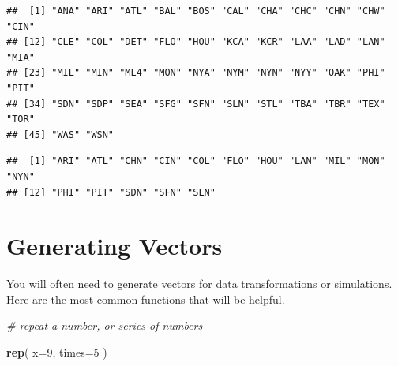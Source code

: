 \documentclass[]{book}
\newenvironment{Shaded}{\begin{snugshade}}{\end{snugshade}}
\newcommand{\CommentTok}[1]{\textcolor[rgb]{0.56,0.35,0.01}{\textit{#1}}}
\newcommand{\DataTypeTok}[1]{\textcolor[rgb]{0.13,0.29,0.53}{#1}}
\newcommand{\DecValTok}[1]{\textcolor[rgb]{0.00,0.00,0.81}{#1}}
\newcommand{\KeywordTok}[1]{\textcolor[rgb]{0.13,0.29,0.53}{\textbf{#1}}}
\newcommand{\NormalTok}[1]{#1}
\newcommand{\OperatorTok}[1]{\textcolor[rgb]{0.81,0.36,0.00}{\textbf{#1}}}
\newcommand{\StringTok}[1]{\textcolor[rgb]{0.31,0.60,0.02}{#1}}
\theoremstyle{definition}
\theoremstyle{definition}
\theoremstyle{definition}
\theoremstyle{remark}
\begin{document}
\begin{Shaded}
\end{Shaded}

\begin{verbatim}
##  [1] "ANA" "ARI" "ATL" "BAL" "BOS" "CAL" "CHA" "CHC" "CHN" "CHW" "CIN"
## [12] "CLE" "COL" "DET" "FLO" "HOU" "KCA" "KCR" "LAA" "LAD" "LAN" "MIA"
## [23] "MIL" "MIN" "ML4" "MON" "NYA" "NYM" "NYN" "NYY" "OAK" "PHI" "PIT"
## [34] "SDN" "SDP" "SEA" "SFG" "SFN" "SLN" "STL" "TBA" "TBR" "TEX" "TOR"
## [45] "WAS" "WSN"
\end{verbatim}

\begin{Shaded}
\end{Shaded}

\begin{verbatim}
##  [1] "ARI" "ATL" "CHN" "CIN" "COL" "FLO" "HOU" "LAN" "MIL" "MON" "NYN"
## [12] "PHI" "PIT" "SDN" "SFN" "SLN"
\end{verbatim}

\hypertarget{generating-vectors}{%
\section{Generating Vectors}\label{generating-vectors}}

You will often need to generate vectors for data transformations or
simulations. Here are the most common functions that will be helpful.

\begin{Shaded}
\begin{Highlighting}[]
\CommentTok{# repeat a number, or series of numbers}

\KeywordTok{rep}\NormalTok{( }\DataTypeTok{x=}\DecValTok{9}\NormalTok{, }\DataTypeTok{times=}\DecValTok{5}\NormalTok{ )}
\end{Highlighting}
\end{Shaded}
\end{document}
